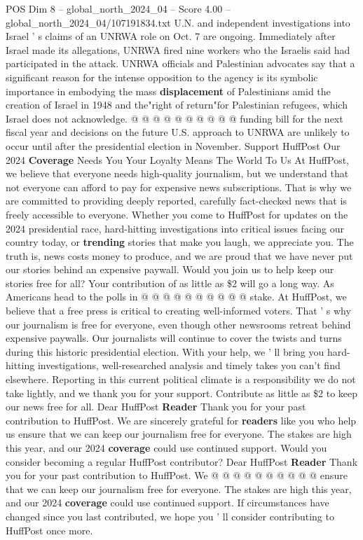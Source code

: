 \begin{textsample}{POS Dim 8 – global\_north\_2024\_04 – Score 4.00 – global\_north\_2024\_04/107191834.txt}
U.N. and independent investigations into Israel ' s claims of an UNRWA role on Oct. 7 are ongoing.
Immediately after Israel made its allegations, UNRWA fired nine workers who the Israelis said had participated in the attack.
UNRWA officials and Palestinian advocates say that a significant reason for the intense opposition to the agency is its symbolic importance in embodying the mass \textbf{displacement} of Palestinians amid the creation of Israel in 1948 and the"right of return"for Palestinian refugees, which Israel does not acknowledge. @ @ @ @ @ @ @ @ @ @ funding bill for the next fiscal year and decisions on the future U.S. approach to UNRWA are unlikely to occur until after the presidential election in November.
Support HuffPost Our 2024 \textbf{Coverage} Needs You Your Loyalty Means The World To Us At HuffPost, we believe that everyone needs high-quality journalism, but we understand that not everyone can afford to pay for expensive news subscriptions.
That is why we are committed to providing deeply reported, carefully fact-checked news that is freely accessible to everyone.
Whether you come to HuffPost for updates on the 2024 presidential race, hard-hitting investigations into critical issues facing our country today, or \textbf{trending} stories that make you laugh, we appreciate you.
The truth is, news costs money to produce, and we are proud that we have never put our stories behind an expensive paywall.
Would you join us to help keep our stories free for all?
Your contribution of as little as \$2 will go a long way.
As Americans head to the polls in @ @ @ @ @ @ @ @ @ @ stake.
At HuffPost, we believe that a free press is critical to creating well-informed voters.
That ' s why our journalism is free for everyone, even though other newsrooms retreat behind expensive paywalls.
Our journalists will continue to cover the twists and turns during this historic presidential election.
With your help, we ' ll bring you hard-hitting investigations, well-researched analysis and timely takes you can't find elsewhere.
Reporting in this current political climate is a responsibility we do not take lightly, and we thank you for your support.
Contribute as little as \$2 to keep our news free for all.
Dear HuffPost \textbf{Reader} Thank you for your past contribution to HuffPost.
We are sincerely grateful for \textbf{readers} like you who help us ensure that we can keep our journalism free for everyone.
The stakes are high this year, and our 2024 \textbf{coverage} could use continued support.
Would you consider becoming a regular HuffPost contributor?
Dear HuffPost \textbf{Reader} Thank you for your past contribution to HuffPost.
We @ @ @ @ @ @ @ @ @ @ ensure that we can keep our journalism free for everyone.
The stakes are high this year, and our 2024 \textbf{coverage} could use continued support.
If circumstances have changed since you last contributed, we hope you ' ll consider contributing to HuffPost once more.

\end{textsample}
